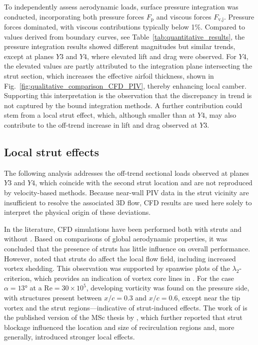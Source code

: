 \documentclass[wes, manuscript]{copernicus}
\begin{document}
To independently assess aerodynamic loads, surface pressure integration was conducted, incorporating both pressure forces $F_{\textrm{p}}$ and viscous forces $F_{\textrm{v,j}}$. Pressure forces dominated, with viscous contributions typically below 1\%. Compared to values derived from boundary curves, see  Table~\ref{tab:quantitative_results}, the pressure integration results showed different magnitudes but similar trends, except at planes $Y3$ and $Y4$, where elevated lift and drag were observed. For $Y4$, the elevated values are partly attributed to the integration plane intersecting the strut section, which increases the effective airfoil thickness, shown in Fig.~\ref{fig:qualitative_comparison_CFD_PIV}, thereby enhancing local camber. Supporting this interpretation is the observation that the discrepancy in trend is not captured by the bound integration methods. A further contribution could stem from a local strut effect, which, although smaller than at $Y4$, may also contribute to the off-trend increase in lift and drag observed at $Y3$.
%
\subsection{Local strut effects}\label{sec:local_strut_effects}
%
The following analysis addresses the off-trend sectional loads observed at planes $Y3$ and $Y4$, which coincide with the second strut location and are not reproduced by velocity-based methods. Because near-wall PIV data in the strut vicinity are insufficient to resolve the associated 3D flow, CFD results are used here solely to interpret the physical origin of these deviations.

In the literature, CFD simulations have been performed both with struts \citep{Vire2022} and without \citep{Vire2020}. Based on comparisons of global aerodynamic properties, it was concluded that the presence of struts has little influence on overall performance. However, \cite{Vire2022} noted that struts do affect the local flow field, including increased vortex shedding. This observation was supported by 
spanwise plots of the $\lambda_2$-criterion, which provides an indication of vortex core lines in \citep{Jeong1995}. For the case $\alpha = 13\unit{\degree}$ at a $\mathrm{Re} = 30 \times 10^5$, developing vorticity was found on the pressure side, with structures present between $x/c = 0.3$ and $x/c = 0.6$, except near the tip vortex and the strut regions—indicative of strut-induced effects. The work of \cite{Vire2022} is the published version of the MSc thesis by \cite{Lebesque2020}, which further reported that strut blockage influenced the location and size of recirculation regions and, more generally, introduced stronger local effects.
\end{document}
